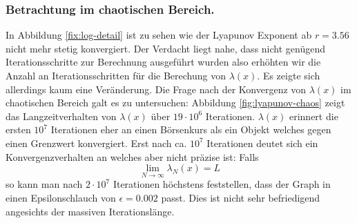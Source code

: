 \documentclass{scrartcl}
\begin{document}
\subsubsection{Betrachtung im chaotischen Bereich.}
In Abbildung \ref{fix:log-detail} ist zu sehen wie der Lyapunov Exponent ab $r=3.56$ nicht mehr stetig konvergiert. 
Der Verdacht liegt nahe, dass nicht genügend Iterationsschritte zur Berechnung ausgeführt wurden also erhöhten wir die Anzahl an Iterationsschritten für die Berechung von $\lambda(x)$. Es zeigte sich allerdings kaum eine Veränderung. Die Frage nach der Konvergenz von $\lambda(x)$ im chaotischen Bereich galt es zu untersuchen: Abbildung \ref{fig:lyapunov-chaos} zeigt das Langzeitverhalten von $\lambda(x)$ über $19\cdot10^6$ Iterationen. $\lambda(x)$ erinnert die ersten $10^7$ Iterationen eher an einen Börsenkurs als ein Objekt welches gegen einen Grenzwert konvergiert. Erst nach ca. $10^7$ Iterationen deutet sich ein Konvergenzverhalten an welches aber nicht präzise ist: Falls 
\begin{equation}
\lim_{N \rightarrow \infty} \lambda_N(x) = L
\end{equation}
so kann man nach $2\cdot10^7$ Iterationen höchstens feststellen, dass der Graph in einen Epsilonschlauch von $\epsilon=0.002$ passt. Dies ist nicht sehr befriedigend angesichts der massiven Iterationslänge.
\end{document}
